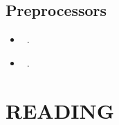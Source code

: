 \documentclass[a4paper]{tufte-handout}
\begin{document}
\begin{counters}
		
		\subsection*{Preprocessors}
		\begin{itemize}
			\item \arjun{}~\citep{SM21}.
			\item \bpluse{}~\citep{LLM16,LLM20}.
		\end{itemize}
	
	\end{counters}
	
	
	\section*{READING}
	
	
\end{document}
